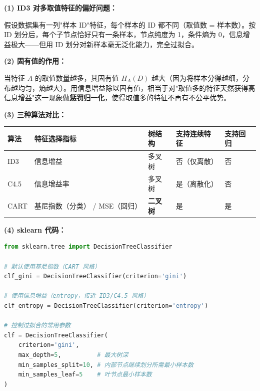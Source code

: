 \documentclass[a4paper,11pt]{ctexart}
\begin{document}
\begin{solutionbox}[参考答案与详细解析]
    \textbf{(1) ID3 对多取值特征的偏好问题：}

    假设数据集有一列"样本 ID"特征，每个样本的 ID 都不同（取值数 = 样本数）。按 ID 划分后，每个子节点恰好只有一条样本，节点纯度为 1，条件熵为 0，信息增益极大——但用 ID 划分对新样本毫无泛化能力，完全过拟合。

    \textbf{(2) 固有值的作用：}

    当特征 $A$ 的取值数量越多，其固有值 $H_A(D)$ 越大（因为将样本分得越细，分布越均匀，熵越大）。用信息增益除以固有值，相当于对"取值多的特征天然获得高信息增益"这一现象做\textbf{惩罚归一化}，使得取值多的特征不再有不公平优势。

    \textbf{(3) 三种算法对比：}

    \begin{center}
    \begin{tabular}{p{2cm} p{2.8cm} p{2.8cm} p{3cm} p{2.5cm}}
        \toprule
        算法 & 特征选择指标 & 树结构 & 支持连续特征 & 支持回归 \\
        \midrule
        ID3 & 信息增益 & 多叉树 & 否（仅离散） & 否 \\
        C4.5 & 信息增益率 & 多叉树 & 是（离散化） & 否 \\
        CART & 基尼指数（分类） / MSE（回归） & \textbf{二叉树} & 是 & 是 \\
        \bottomrule
    \end{tabular}
    \end{center}

    \textbf{(4) sklearn 代码：}

    \begin{lstlisting}[language=Python]
from sklearn.tree import DecisionTreeClassifier

# 默认使用基尼指数（CART 风格）
clf_gini = DecisionTreeClassifier(criterion='gini')

# 使用信息增益（entropy，接近 ID3/C4.5 风格）
clf_entropy = DecisionTreeClassifier(criterion='entropy')

# 控制过拟合的常用参数
clf = DecisionTreeClassifier(
    criterion='gini',
    max_depth=5,          # 最大树深
    min_samples_split=10, # 内部节点继续划分所需最小样本数
    min_samples_leaf=5    # 叶节点最小样本数
)
    \end{lstlisting}
\end{solutionbox}
\end{document}
